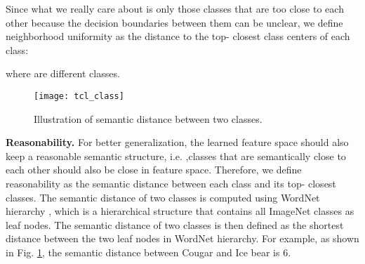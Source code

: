 \documentclass[10pt,twocolumn,letterpaper]{article}
\begin{document}
Since what we really care about is only those classes that are too close to each other because the decision boundaries between them can be unclear, we define neighborhood uniformity as the distance to the top- closest class centers of each class:

where  are different classes.

\begin{figure}[h]
\begin{center}
\texttt{[image: tcl\_class]}
\end{center}
\vspace{-15pt}
\caption{Illustration of semantic distance between two classes.}
\label{fig:semantic}
\vspace{-5pt}
\end{figure}

\textbf{Reasonability.} For better generalization, the learned feature space should also keep a reasonable semantic structure, i.e. ,classes that are semantically close to each other should also be close in feature space. Therefore, we define reasonability as the semantic distance between each class and its top- closest classes. The semantic distance of two classes is computed using WordNet hierarchy \cite{miller1995wordnet}, which is a hierarchical structure that contains all ImageNet classes as leaf nodes. The semantic distance of two classes is then defined as the shortest distance between the two leaf nodes in WordNet hierarchy. For example, as shown in Fig. \ref{fig:semantic}, the semantic distance between Cougar and Ice bear is 6.
\end{document}
